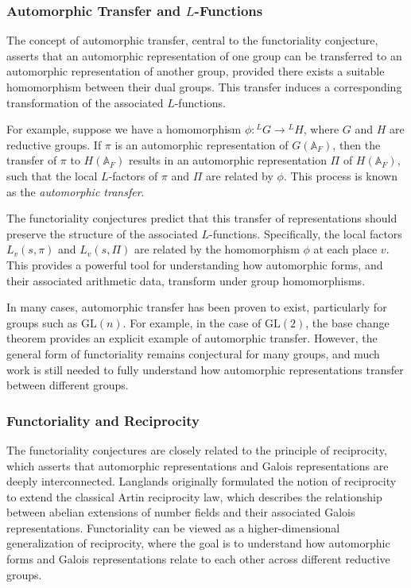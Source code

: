 \documentclass{article}
\theoremstyle{remark}
\begin{document}
\subsubsection{Automorphic Transfer and $L$-Functions}

The concept of automorphic transfer, central to the functoriality conjecture, asserts that an automorphic representation of one group can be transferred to an automorphic representation of another group, provided there exists a suitable homomorphism between their dual groups. This transfer induces a corresponding transformation of the associated $L$-functions.

For example, suppose we have a homomorphism $\phi: {}^L G \to {}^L H$, where $G$ and $H$ are reductive groups. If $\pi$ is an automorphic representation of $G(\mathbb{A}_F)$, then the transfer of $\pi$ to $H(\mathbb{A}_F)$ results in an automorphic representation $\Pi$ of $H(\mathbb{A}_F)$, such that the local $L$-factors of $\pi$ and $\Pi$ are related by $\phi$. This process is known as the \emph{automorphic transfer}.

The functoriality conjectures predict that this transfer of representations should preserve the structure of the associated $L$-functions. Specifically, the local factors $L_v(s, \pi)$ and $L_v(s, \Pi)$ are related by the homomorphism $\phi$ at each place $v$. This provides a powerful tool for understanding how automorphic forms, and their associated arithmetic data, transform under group homomorphisms.

In many cases, automorphic transfer has been proven to exist, particularly for groups such as $\text{GL}(n)$. For example, in the case of $\text{GL}(2)$, the base change theorem provides an explicit example of automorphic transfer. However, the general form of functoriality remains conjectural for many groups, and much work is still needed to fully understand how automorphic representations transfer between different groups.

\subsubsection{Functoriality and Reciprocity}

The functoriality conjectures are closely related to the principle of reciprocity, which asserts that automorphic representations and Galois representations are deeply interconnected. Langlands originally formulated the notion of reciprocity to extend the classical Artin reciprocity law, which describes the relationship between abelian extensions of number fields and their associated Galois representations. Functoriality can be viewed as a higher-dimensional generalization of reciprocity, where the goal is to understand how automorphic forms and Galois representations relate to each other across different reductive groups.
\end{document}

